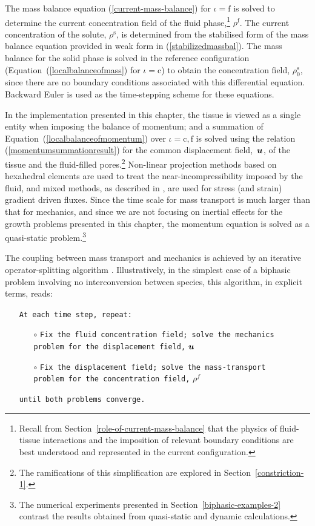 The mass balance equation (\ref{current-mass-balance}) for
\mbox{$\iota = \mathrm{f}$} is solved to determine the current
concentration field of the fluid phase,\footnote{Recall from
  Section~\ref{role-of-current-mass-balance} that the physics of
  fluid-tissue interactions and the imposition of relevant boundary
  conditions are best understood and represented in the current
  configuration.} $\rho^{\mathrm{f}}$. The current
concentration of the solute, $\rho^{\mathrm{s}}$, is determined from
the stabilised form of the mass balance equation provided in weak form
in (\ref{stabilizedmassbal}). The mass balance for the solid phase is
solved in the reference configuration
(Equation~(\ref{localbalanceofmass}) for \mbox{$\iota = \mathrm{c}$}) to
obtain the concentration field, $\rho_{0}^{\mathrm{s}}$, since there
are no boundary conditions associated with this differential
equation. Backward Euler is used as the time-stepping scheme for these
equations.

In the implementation presented in this chapter, the tissue is viewed
as a single entity when imposing the balance of momentum; and a
summation of Equation~(\ref{localbalanceofmomentum}) over
$\iota=\mathrm{c,f}$ is solved using the relation
(\ref{momentumsummationresult}) for the common displacement
\mbox{field, $\mbox{\boldmath$ u$}$,} of the tissue and the fluid-filled
pores.\footnote{The ramifications of this simplification are
  explored in Section~\ref{constriction-1}.} Non-linear projection
methods \citep{simotaylorpister:85} based on hexahedral elements are
used to treat the near-incompressibility imposed by the fluid, and
mixed methods, as described in \cite{Garikipatiox2:01}, are used for
stress (and strain) gradient driven fluxes. Since the time scale for
mass transport is much larger than that for mechanics, and since we
are not focusing on inertial effects for the growth problems presented
in this chapter, the momentum equation is solved as a quasi-static
problem.\footnote{The numerical experiments presented in
  Section~\ref{biphasic-examples-2} contrast the results obtained from
  quasi-static and dynamic calculations.}

The coupling between mass transport and mechanics is achieved by an
iterative operator-splitting algorithm
\citep{Armero-poroplasticity:99, Garikipatietal:01}. Illustratively,
in the simplest case of a biphasic problem involving no
interconversion between species, this algorithm, in explicit terms,
reads:

\begin{itemize}
\item[] {\tt At each time step, repeat:}
  \begin{itemize}
  \item[$\circ$] {\tt Fix the fluid concentration field; solve the
    mechanics\\ problem for the displacement field,} $\mbox{\boldmath$ u$}$
  \item[$\circ$] {\tt Fix the displacement field; solve the
    mass-transport\\ problem for the concentration field,} $\rho^f$
  \end{itemize}
\item[]{\tt until both problems converge.}
\end{itemize}

